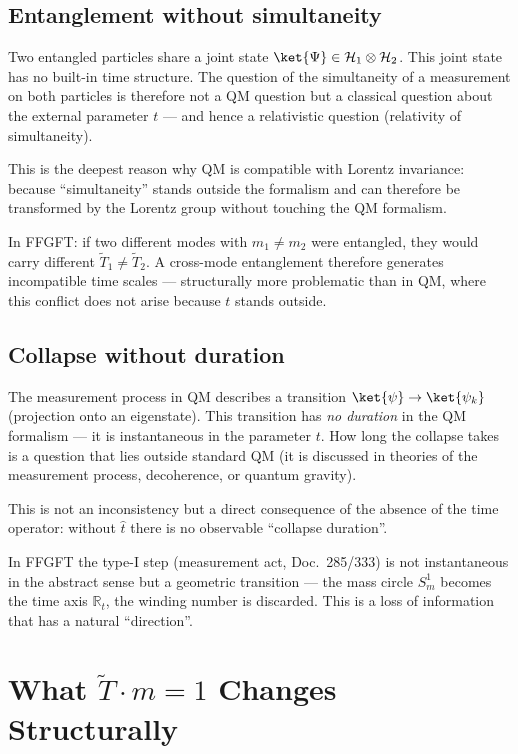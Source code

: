 \subsection{Entanglement without simultaneity}

Two entangled particles share a joint state
$\ket{\Psi}\in\mathcal{H}_1\otimes\mathcal{H}_2$. This joint state
has no built-in time structure. The question of the simultaneity of
a measurement on both particles is therefore not a QM question but a
classical question about the external parameter $t$ — and hence a
relativistic question (relativity of simultaneity).

This is the deepest reason why QM is compatible with Lorentz
invariance: because ``simultaneity'' stands outside the formalism
and can therefore be transformed by the Lorentz group without
touching the QM formalism.

In FFGFT: if two different modes with $m_1\neq m_2$ were entangled,
they would carry different $\tilde{T}_1\neq\tilde{T}_2$. A
cross-mode entanglement therefore generates incompatible time scales
— structurally more problematic than in QM, where this conflict does
not arise because $t$ stands outside.

\subsection{Collapse without duration}

The measurement process in QM describes a transition
$\ket{\psi}\to\ket{\psi_k}$ (projection onto an eigenstate). This
transition has \emph{no duration} in the QM formalism — it is
instantaneous in the parameter $t$. How long the collapse takes is a
question that lies outside standard QM (it is discussed in theories
of the measurement process, decoherence, or quantum gravity).

This is not an inconsistency but a direct consequence of the absence
of the time operator: without $\hat{t}$ there is no observable
``collapse duration''.

In FFGFT the type-I step (measurement act, Doc.~285/333) is not
instantaneous in the abstract sense but a geometric transition —
the mass circle $S^1_m$ becomes the time axis $\mathbb{R}_t$, the
winding number is discarded. This is a loss of information that has
a natural ``direction''.

\section{What $\tilde{T}\cdot m = 1$ Changes Structurally}

